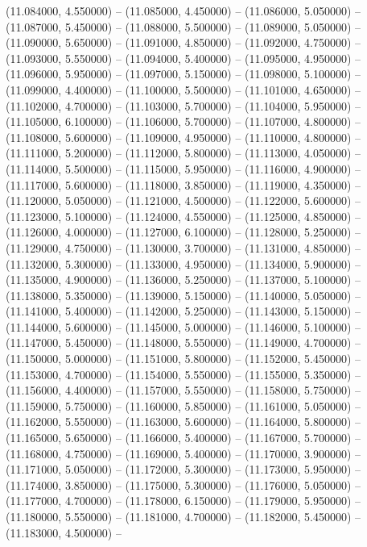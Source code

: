(11.084000, 4.550000) -- 
(11.085000, 4.450000) -- 
(11.086000, 5.050000) -- 
(11.087000, 5.450000) -- 
(11.088000, 5.500000) -- 
(11.089000, 5.050000) -- 
(11.090000, 5.650000) -- 
(11.091000, 4.850000) -- 
(11.092000, 4.750000) -- 
(11.093000, 5.550000) -- 
(11.094000, 5.400000) -- 
(11.095000, 4.950000) -- 
(11.096000, 5.950000) -- 
(11.097000, 5.150000) -- 
(11.098000, 5.100000) -- 
(11.099000, 4.400000) -- 
(11.100000, 5.500000) -- 
(11.101000, 4.650000) -- 
(11.102000, 4.700000) -- 
(11.103000, 5.700000) -- 
(11.104000, 5.950000) -- 
(11.105000, 6.100000) -- 
(11.106000, 5.700000) -- 
(11.107000, 4.800000) -- 
(11.108000, 5.600000) -- 
(11.109000, 4.950000) -- 
(11.110000, 4.800000) -- 
(11.111000, 5.200000) -- 
(11.112000, 5.800000) -- 
(11.113000, 4.050000) -- 
(11.114000, 5.500000) -- 
(11.115000, 5.950000) -- 
(11.116000, 4.900000) -- 
(11.117000, 5.600000) -- 
(11.118000, 3.850000) -- 
(11.119000, 4.350000) -- 
(11.120000, 5.050000) -- 
(11.121000, 4.500000) -- 
(11.122000, 5.600000) -- 
(11.123000, 5.100000) -- 
(11.124000, 4.550000) -- 
(11.125000, 4.850000) -- 
(11.126000, 4.000000) -- 
(11.127000, 6.100000) -- 
(11.128000, 5.250000) -- 
(11.129000, 4.750000) -- 
(11.130000, 3.700000) -- 
(11.131000, 4.850000) -- 
(11.132000, 5.300000) -- 
(11.133000, 4.950000) -- 
(11.134000, 5.900000) -- 
(11.135000, 4.900000) -- 
(11.136000, 5.250000) -- 
(11.137000, 5.100000) -- 
(11.138000, 5.350000) -- 
(11.139000, 5.150000) -- 
(11.140000, 5.050000) -- 
(11.141000, 5.400000) -- 
(11.142000, 5.250000) -- 
(11.143000, 5.150000) -- 
(11.144000, 5.600000) -- 
(11.145000, 5.000000) -- 
(11.146000, 5.100000) -- 
(11.147000, 5.450000) -- 
(11.148000, 5.550000) -- 
(11.149000, 4.700000) -- 
(11.150000, 5.000000) -- 
(11.151000, 5.800000) -- 
(11.152000, 5.450000) -- 
(11.153000, 4.700000) -- 
(11.154000, 5.550000) -- 
(11.155000, 5.350000) -- 
(11.156000, 4.400000) -- 
(11.157000, 5.550000) -- 
(11.158000, 5.750000) -- 
(11.159000, 5.750000) -- 
(11.160000, 5.850000) -- 
(11.161000, 5.050000) -- 
(11.162000, 5.550000) -- 
(11.163000, 5.600000) -- 
(11.164000, 5.800000) -- 
(11.165000, 5.650000) -- 
(11.166000, 5.400000) -- 
(11.167000, 5.700000) -- 
(11.168000, 4.750000) -- 
(11.169000, 5.400000) -- 
(11.170000, 3.900000) -- 
(11.171000, 5.050000) -- 
(11.172000, 5.300000) -- 
(11.173000, 5.950000) -- 
(11.174000, 3.850000) -- 
(11.175000, 5.300000) -- 
(11.176000, 5.050000) -- 
(11.177000, 4.700000) -- 
(11.178000, 6.150000) -- 
(11.179000, 5.950000) -- 
(11.180000, 5.550000) -- 
(11.181000, 4.700000) -- 
(11.182000, 5.450000) -- 
(11.183000, 4.500000) -- 
